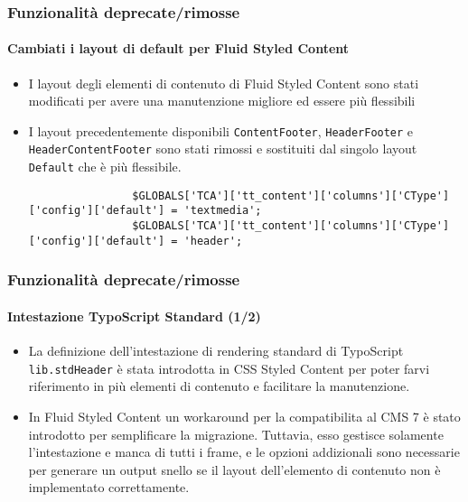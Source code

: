 \begin{frame}[fragile]
	\frametitle{Funzionalità deprecate/rimosse}
	\framesubtitle{Cambiati i layout di default per Fluid Styled Content}

	\lstset{basicstyle=\tiny\ttfamily}

	\begin{itemize}
		\item I layout degli elementi di contenuto di Fluid Styled Content sono stati modificati per avere
			una manutenzione migliore ed essere più flessibili
			
		\item I layout precedentemente disponibili \texttt{ContentFooter}, \texttt{HeaderFooter} e
			\texttt{HeaderContentFooter} sono stati rimossi e sostituiti dal singolo layout \texttt{Default} 
			che è più flessibile.

			\begin{lstlisting}
				$GLOBALS['TCA']['tt_content']['columns']['CType']['config']['default'] = 'textmedia';
				$GLOBALS['TCA']['tt_content']['columns']['CType']['config']['default'] = 'header';
			\end{lstlisting}

	\end{itemize}

\end{frame}


\begin{frame}[fragile]
	\frametitle{Funzionalità deprecate/rimosse}
	\framesubtitle{Intestazione TypoScript Standard (1/2)}

	\begin{itemize}
		\item La definizione dell'intestazione di rendering standard di TypoScript \texttt{lib.stdHeader} è stata introdotta in
			CSS Styled Content per poter farvi riferimento in più elementi di contenuto e facilitare la manutenzione.

		\item In Fluid Styled Content un workaround per la compatibilita al CMS 7 è stato introdotto per semplificare la migrazione.
			Tuttavia, esso gestisce solamente l'intestazione e manca di tutti i frame, e le opzioni addizionali sono necessarie
			per generare un output snello se il layout dell'elemento di contenuto non è implementato correttamente.

	\end{itemize}

\end{frame}

